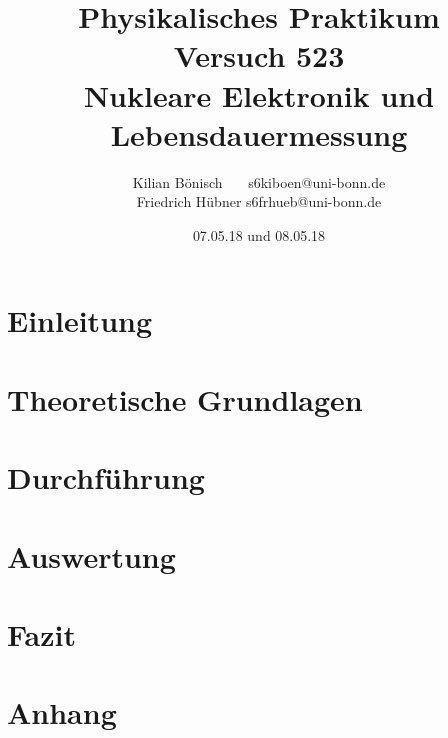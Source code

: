 \documentclass{article}
\newcommand{\RM}[1]{\MakeUppercase{\romannumeral #1}}
\begin{document}
\setlength{\parindent}{0em}   %
\title{Physikalisches Praktikum \RM{5}\\Versuch 523\\Nukleare Elektronik und Lebensdauermessung}
\author{Kilian Bönisch \ \ \ \qquad s6kiboen@uni-bonn.de \\
  Friedrich Hübner \qquad s6frhueb@uni-bonn.de }
\date{07.05.18 und 08.05.18}

\maketitle
\thispagestyle{empty}

\newpage

\thispagestyle{empty}

\tableofcontents

\newpage

\section{Einleitung}



\section{Theoretische Grundlagen}



\section{Durchführung}





\section{Auswertung}







\section{Fazit}



\FloatBarrier

\newpage

\printbibliography

\newpage

\section{Anhang}

\end{document}
